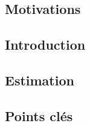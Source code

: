 {
    \subsection{Motivations}

    \subsection{Introduction}

    \subsection{Estimation}

    \subsection{Points clés}
}